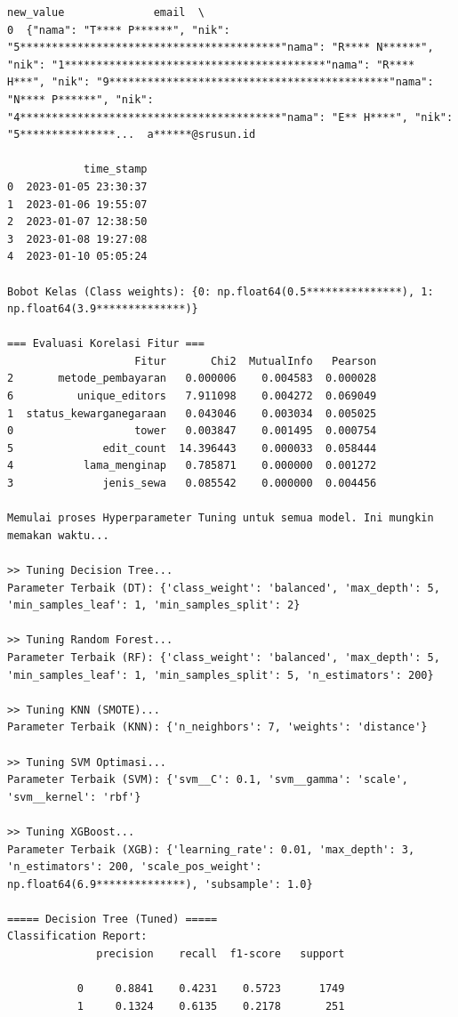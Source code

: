 \begin{lstlisting}[caption={Output 1}]
                                           new_value              email  \
0  {"nama": "T**** P******", "nik": "5*****************************************"nama": "R**** N******", "nik": "1*****************************************"nama": "R**** H***", "nik": "9********************************************"nama": "N**** P******", "nik": "4*****************************************"nama": "E** H****", "nik": "5***************...  a******@srusun.id   

            time_stamp  
0  2023-01-05 23:30:37  
1  2023-01-06 19:55:07  
2  2023-01-07 12:38:50  
3  2023-01-08 19:27:08  
4  2023-01-10 05:05:24  

Bobot Kelas (Class weights): {0: np.float64(0.5***************), 1: np.float64(3.9**************)}

=== Evaluasi Korelasi Fitur ===
                    Fitur       Chi2  MutualInfo   Pearson
2       metode_pembayaran   0.000006    0.004583  0.000028
6          unique_editors   7.911098    0.004272  0.069049
1  status_kewarganegaraan   0.043046    0.003034  0.005025
0                   tower   0.003847    0.001495  0.000754
5              edit_count  14.396443    0.000033  0.058444
4           lama_menginap   0.785871    0.000000  0.001272
3              jenis_sewa   0.085542    0.000000  0.004456

Memulai proses Hyperparameter Tuning untuk semua model. Ini mungkin memakan waktu...

>> Tuning Decision Tree...
Parameter Terbaik (DT): {'class_weight': 'balanced', 'max_depth': 5, 'min_samples_leaf': 1, 'min_samples_split': 2}

>> Tuning Random Forest...
Parameter Terbaik (RF): {'class_weight': 'balanced', 'max_depth': 5, 'min_samples_leaf': 1, 'min_samples_split': 5, 'n_estimators': 200}

>> Tuning KNN (SMOTE)...
Parameter Terbaik (KNN): {'n_neighbors': 7, 'weights': 'distance'}

>> Tuning SVM Optimasi...
Parameter Terbaik (SVM): {'svm__C': 0.1, 'svm__gamma': 'scale', 'svm__kernel': 'rbf'}

>> Tuning XGBoost...
Parameter Terbaik (XGB): {'learning_rate': 0.01, 'max_depth': 3, 'n_estimators': 200, 'scale_pos_weight': np.float64(6.9**************), 'subsample': 1.0}

===== Decision Tree (Tuned) =====
Classification Report:
              precision    recall  f1-score   support

           0     0.8841    0.4231    0.5723      1749
           1     0.1324    0.6135    0.2178       251


\end{lstlisting}
